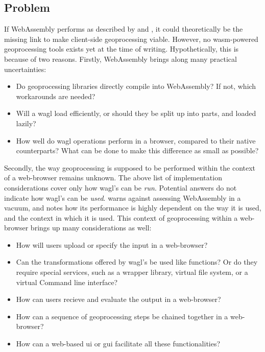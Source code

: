 


\newpage

\subsection{Problem}

If WebAssembly performs as described by \cite{haas_bringing_2017} and \cite{jangda_not_2019}, it could theoretically be the missing link to make client-side geoprocessing viable. However, no wasm-powered geoprocessing tools exists yet at the time of writing. Hypothetically, this is because of two reasons. Firstly, WebAssembly brings along many practical uncertainties:

\begin{itemize}
  \item Do geoprocessing libraries directly compile into WebAssembly? If not, which workarounds are needed? 
  \item Will a \ac{wagl} load efficiently, or should they be split up into parts, and loaded lazily? 
  \item How well do \ac{wagl} operations perform in a browser, compared to their native counterparts? What can be done to make this difference as small as possible?
\end{itemize}

Secondly, the way geoprocessing is supposed to be performed within the context of a web-browser remains unknown. The above list of implementation considerations cover only how \ac{wagl}'s can be \emph{run}. Potential answers do not indicate how \ac{wagl}'s can be \emph{used}. \cite{jangda_not_2019} warns against assessing WebAssembly in a vacuum, and notes how its performance is highly dependent on the way it is used, and the context in which it is used. This context of geoprocessing within a web-browser brings up many considerations as well: 

\begin{itemize}
  \item How will users upload or specify the input in a web-browser?
  \item Can the transformations offered by \ac{wagl}'s be used like functions? Or do they require special services, such as a wrapper library, virtual file system, or a virtual Command line interface? 
  \item How can users recieve and evaluate the output in a web-browser?
  \item How can a sequence of geoprocessing steps be chained together in a web-browser?
  \item How can a web-based \ac{ui} or \ac{gui} facilitate all these functionalities?
\end{itemize}

